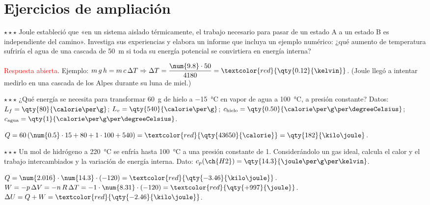 \section{Ejercicios de ampliación}\label{sec:ud13-ampliacion}

\begin{exercise}
    \(\star\star\star\) Joule estableció que «en un sistema aislado térmicamente, el trabajo necesario para pasar de un estado A a
    un estado B es independiente del camino». Investiga sus experiencias y elabora un informe que incluya un ejemplo numérico: ¿qué
    aumento de temperatura sufriría el agua de una cascada de \qty{50}{\m} si toda su energía potencial se convirtiera en energía
    interna?
    \begin{solu}
        \textcolor{red}{Respuesta abierta}. Ejemplo: \(m\,g\,h = m\,c\,\Delta T \Rightarrow \Delta T = \dfrac{\num{9.8} \cdot 50}{4180} =
        \textcolor{red}{\qty{0.12}{\kelvin}}\). (Joule llegó a intentar medirlo en una cascada de los Alpes durante su luna de miel.)
    \end{solu}
\end{exercise}

\begin{exercise}
    \(\star\star\star\) ¿Qué energía se necesita para transformar \qty{60}{\g} de hielo a \qty{-15}{\degreeCelsius} en vapor de agua a
    \qty{100}{\degreeCelsius}, a presión constante? Datos: \(L_f = \qty{80}{\calorie\per\g}\); \(L_v = \qty{540}{\calorie\per\g}\);
    \(c_{\text{hielo}} = \qty{0.50}{\calorie\per\g\per\degreeCelsius}\); \(c_{\text{agua}} = \qty{1}{\calorie\per\g\per\degreeCelsius}\).
    \begin{solu}
        \(Q = 60\,(\num{0.5} \cdot 15 + 80 + 1 \cdot 100 + 540) = \textcolor{red}{\qty{43650}{\calorie}} = \qty{182}{\kilo\joule}\).
    \end{solu}
\end{exercise}

\begin{exercise}
    \(\star\star\star\) Un mol de hidrógeno a \qty{220}{\degreeCelsius} se enfría hasta \qty{100}{\degreeCelsius} a una presión
    constante de \qty{1}{\atm}. Considerándolo un gas ideal, calcula el calor y el trabajo intercambiados y la variación de energía
    interna. Dato: \(c_p(\ch{H2}) = \qty{14.3}{\joule\per\g\per\kelvin}\).
    \begin{solu}
        \(Q = \num{2.016} \cdot \num{14.3} \cdot (-120) = \textcolor{red}{\qty{-3.46}{\kilo\joule}}\).
        \(W = -p\,\Delta V = -n\,R\,\Delta T = -1 \cdot \num{8.31} \cdot (-120) = \textcolor{red}{\qty{+997}{\joule}}\).
        \(\Delta U = Q + W = \textcolor{red}{\qty{-2.46}{\kilo\joule}}\).
    \end{solu}
\end{exercise}

